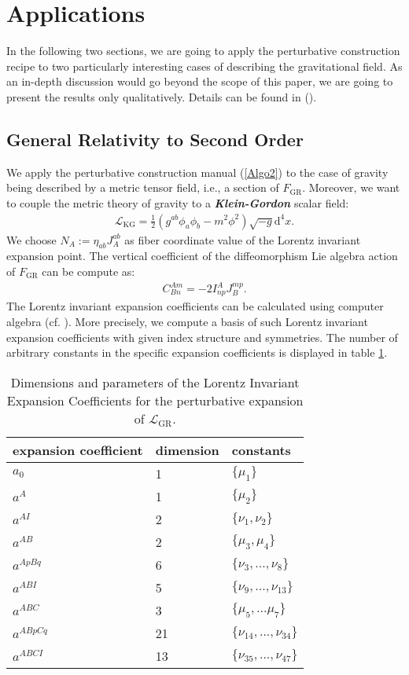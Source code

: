 \documentclass[%
 reprint,
nofootinbib,
 amsmath,amssymb,
 aps,
 prd,
floatfix,
]{revtex4-2}
\begin{document}
\section{Applications}
In the following two sections, we are going to apply the perturbative construction recipe to two particularly interesting cases of describing the gravitational field. 
As an in-depth discussion would go beyond the scope of this paper, we are going to present the results only qualitatively. Details can be found in (\cite{TobiMaster}).
\subsection{General Relativity to Second Order}
We apply the perturbative construction manual (\ref{Algo2}) to the case of gravity being described by a metric tensor field, i.e., a section of $F_{\text{GR}}$. 
Moreover, we want to couple the metric theory of gravity to a \textit{\textbf{Klein-Gordon}} scalar field:
\begin{align}\label{KGL}
    \mathcal{L}_{\text{KG}} = \frac{1}{2} \left ( g^{ab} \phi_a \phi_b - m^2 \phi^2\right )\sqrt{-g} \mathrm{d}^4x.
\end{align}
We choose $N_A := \eta_{ab} J_A^{ab} $ as fiber coordinate value of the Lorentz invariant expansion point. The vertical coefficient of the diffeomorphism Lie algebra action of $F_{\text{GR}}$ can be compute as:
\begin{align}
    C^{Am}_{Bn} = -2 I^A_{np} J_B^{mp}.
\end{align}
The Lorentz invariant expansion coefficients can be calculated using computer algebra (cf. \cite{sparse-tensor}). More precisely, we compute a basis of such Lorentz invariant expansion coefficients with given index structure and symmetries. The number of arbitrary constants in the
specific expansion coefficients is displayed in table \ref{GRExp}.
\begin{table}
\centering 
\begin{tabular}{lll}\toprule
    expansion coefficient & dimension & constants   \\ \midrule
    $a_0$ & 1 & $\{\mu_1\}$ \\
    $a^A$ & 1 & $\{\mu_2\}$ \\
    $a^{AI}$ & 2 & $\{\nu_1, \nu_2\}$ \\
    $a^{AB}$ & 2 & $\{\mu_3, \mu_4 \} $ \\
    $a^{ApBq}$ & 6 & $\{\nu_3,...,\nu_8\}$ \\
    $a^{ABI}$ & 5 & $\{ \nu_9,...,\nu_{13} \}$ \\
    $a^{ABC}$ & 3 & $\{ \mu_5,...\mu_7 \}$\\
    $a^{ABpCq}$ & 21 & $\{\nu_{14},...,\nu_{34} \}$ \\
    $a^{ABCI}$ & 13 & $\{ \nu_{35},...,\nu_{47}\}$\\ \bottomrule
\end{tabular}
\caption{Dimensions and parameters of the Lorentz Invariant Expansion Coefficients for the perturbative expansion of $\mathcal{L}_{\text{GR}}$.}\label{GRExp}
\end{table}
\end{document}
